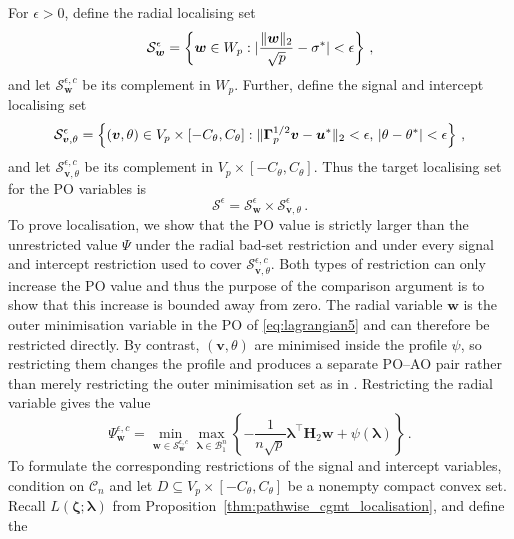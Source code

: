 \documentclass{article}
\makeatletter
\theoremstyle{definition}
\newcommand{\vnorm}[1]{%
	\ensuremath{%
		\if@display
		\left\| #1 \right\|
		\else
		\| #1 \|
		\fi
	}%
}
\newcommand{\abs}[1]{%
	\ensuremath{%
		\if@display
		\left| #1 \right|
		\else
		\lvert #1 \rvert
		\fi
	}%
}
\newcommand*{\bb}{\boldsymbol}
\def\bw {\bb{w}}
\def\bH {\bb{H}}
\def\bu{\bb{u}}
\def\bv{\bb{v}}
\def\bH{\bb{H}}
\def\blambda{\bb{\lambda}}
\makeatother
\begin{document}
\begin{bibunit}
For $\epsilon>0$, define the radial localising set
$$
    \mathcal S_{\bw}^{\epsilon}
    =
    \left\{
        \bw\in W_p:
        \abs{
            \frac{\vnorm{\bw}_2}{\sqrt p}
            -
            \sigma^*
        }
        <
        \epsilon
    \right\}\,,
$$
and let $\mathcal S_{\bw}^{\epsilon,c}$ be its complement in $W_p$.
Further, define the signal and intercept localising set
$$
    \mathcal S_{\bv,\theta}^{\epsilon}
    =
    \left\{
        (\bv,\theta)\in V_p\times[-C_\theta,C_\theta]:
        \vnorm{\bb\Gamma_p^{1/2}\bv-\bu^*}_2<\epsilon,\,
        \abs{\theta-\theta^*}<\epsilon
    \right\}\,,
$$
and let $\mathcal S_{\bv,\theta}^{\epsilon,c}$ be its complement in
$V_p\times[-C_\theta,C_\theta]$. Thus the target localising set for the PO
variables is
$$
    \mathcal S^{\epsilon}
    =
    \mathcal S_{\bw}^{\epsilon}
    \times
    \mathcal S_{\bv,\theta}^{\epsilon} \,.
$$
To prove localisation, we show that the PO value is strictly larger than
the unrestricted value $\Psi$ under the radial bad-set restriction and
under every signal and intercept restriction used to cover
$\mathcal S_{\bv,\theta}^{\epsilon,c}$. Both types of restriction can only
increase the PO value and thus the purpose of the comparison argument is to show
that this increase is bounded away from zero. The radial variable $\bw$ is
the outer minimisation variable in the PO of \eqref{eq:lagrangian5} and can
therefore be restricted directly.
By contrast, $(\bv,\theta)$ are
minimised inside the profile $\psi$, so restricting them changes the
profile and produces a separate PO--AO pair rather than merely restricting
the outer minimisation set as in
\citet[Theorem~3(ii)]{thrampoulidis+etal:2018}.
Restricting the radial variable gives the value
\begin{equation}
\label{eq:PO_restricted_w}
    \Psi_{\bw}^{\epsilon,c}
    =
    \underset{\bw\in\mathcal S_{\bw}^{\epsilon,c}}{\min}
    \underset{\blambda\in\mathcal B^n_1}{\max}
    \left\{
        -\frac1{n\sqrt p}\blambda^\top\bH_2\bw
        +
        \psi(\blambda)
    \right\} \,.
\end{equation}
To formulate the corresponding restrictions of the signal and intercept
variables, condition on $\mathcal C_n$ and let
$D\subseteq V_p\times[-C_\theta,C_\theta]$ be a nonempty compact convex
set. Recall $L(\bb\zeta;\blambda)$ from
Proposition~\ref{thm:pathwise_cgmt_localisation}, and define the

\end{bibunit}
\end{document}
